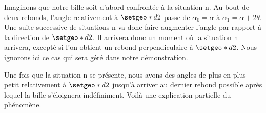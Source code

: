 \medskip

Imaginons que notre bille soit d'abord confrontée à la situation n. Au bout de deux rebonds, l'angle relativement à $\setgeo*{d}{2}$ passe de $\alpha_0 = \alpha$ à $\alpha_1 = \alpha + 2 \theta$. Une suite successive de situations n va donc faire augmenter l'angle par rapport à la direction de $\setgeo*{d}{2}$. Il arrivera donc un moment où la situation n arrivera, excepté si l'on obtient un rebond perpendiculaire à $\setgeo*{d}{2}$. Nous ignorons ici ce cas qui sera géré dans notre démonstration.

Une fois que la situation n se présente, nous avons des angles de plus en plus petit relativement à $\setgeo*{d}{2}$ jusqu'à arriver au dernier rebond possible après lequel la bille s'éloignera indéfiniment. Voilà une explication partielle du phénomène.